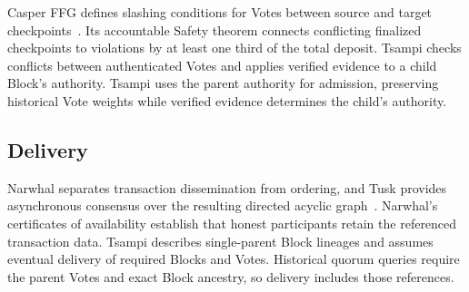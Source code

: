 Casper FFG defines slashing conditions for Votes between source and target checkpoints~\citep[Section 2]{rw-casper}.
Its accountable Safety theorem connects conflicting finalized checkpoints to violations by at least one third of the total deposit.
Tsampi checks conflicts between authenticated Votes and applies verified evidence to a child Block's authority.
Tsampi uses the parent authority for admission, preserving historical Vote weights while verified evidence determines the child's authority.

\subsection{Delivery}

Narwhal separates transaction dissemination from ordering, and Tusk provides asynchronous consensus over the resulting directed acyclic graph~\citep[Sections 3 and 5]{rw-narwhal-tusk}.
Narwhal's certificates of availability establish that honest participants retain the referenced transaction data.
Tsampi describes single-parent Block lineages and assumes eventual delivery of required Blocks and Votes.
Historical quorum queries require the parent Votes and exact Block ancestry, so delivery includes those references.

\begingroup\raggedright

\endgroup

